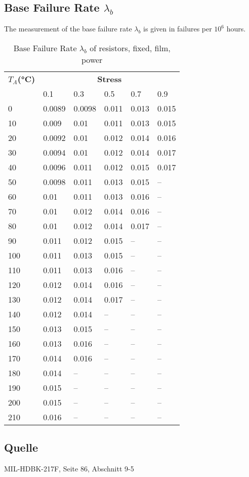 \subsection{Base Failure Rate $\lambda_b$}
The measurement of the base failure rate $\lambda_b$ is given in failures per $10^6$ hours.
\begin{table}[ht]
{\centering

\begin{tabular}{|p{1.1cm}|*{5}{p{1.1cm}|}}
    \hline
    \textbf{$T_A$(°C)} & \multicolumn{5}{c|}{\textbf{Stress}} \\
    & 0.1 & 0.3 & 0.5 & 0.7 & 0.9 \\
    \hline
    0 & 0.0089 & 0.0098 & 0.011 & 0.013 & 0.015 \\
    \hline
    10 & 0.009 & 0.01 & 0.011 & 0.013 & 0.015 \\
    \hline
    20 & 0.0092 & 0.01 & 0.012 & 0.014 & 0.016 \\
    \hline
    30 & 0.0094 & 0.01 & 0.012 & 0.014 & 0.017 \\
    \hline
    40 & 0.0096 & 0.011 & 0.012 & 0.015 & 0.017 \\
    \hline
    50 & 0.0098 & 0.011 & 0.013 & 0.015 & -- \\
    \hline
    60 & 0.01 & 0.011 & 0.013 & 0.016 & -- \\
    \hline
    70 & 0.01 & 0.012 & 0.014 & 0.016 & -- \\
    \hline
    80 & 0.01 & 0.012 & 0.014 & 0.017 & -- \\
    \hline
    90 & 0.011 & 0.012 & 0.015 & -- & -- \\
    \hline
    100 & 0.011 & 0.013 & 0.015 & -- & -- \\
    \hline
    110 & 0.011 & 0.013 & 0.016 & -- & -- \\
    \hline
    120 & 0.012 & 0.014 & 0.016 & -- & -- \\
    \hline
    130 & 0.012 & 0.014 & 0.017 & -- & -- \\
    \hline
    140 & 0.012 & 0.014 & -- & -- & -- \\
    \hline
    150 & 0.013 & 0.015 & -- & -- & -- \\
    \hline
    160 & 0.013 & 0.016 & -- & -- & -- \\
    \hline
    170 & 0.014 & 0.016 & -- & -- & -- \\
    \hline
    180 & 0.014 & -- & -- & -- & -- \\
    \hline
    190 & 0.015 & -- & -- & -- & -- \\
    \hline
    200 & 0.015 & -- & -- & -- & -- \\
    \hline
    210 & 0.016 & -- & -- & -- & -- \\
    \hline
\end{tabular}
\caption{Base Failure Rate $\lambda_b$ of resistors, fixed, film, power}
\label{tab:bfr_resistors_fixed_film_power}
\par}
\subsection*{Quelle}
MIL-HDBK-217F, Seite 86, Abschnitt 9-5
\end{table}